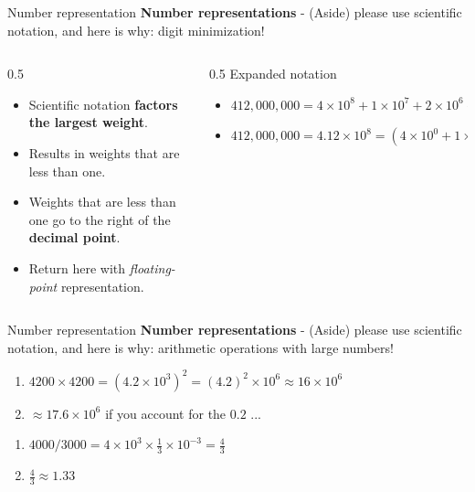 \documentclass{beamer}
\begin{document}
\begin{frame}{Number representation}
\textbf{Number representations} - (Aside) please use scientific notation, and here is why: \alert{digit minimization!} \\ \vspace{1cm}
\begin{columns}[T]
\begin{column}{0.5\textwidth}
\centering
\begin{itemize}
\small
\item Scientific notation \textbf{factors the largest weight}.
\item Results in weights that are less than one.
\item Weights that are less than one go to the right of the \textbf{decimal point}.
\item Return here with \textit{floating-point} representation.
\end{itemize}
\end{column}
\begin{column}{0.5\textwidth}
\centering
Expanded notation \\
\hrulefill
\begin{itemize}
\item $412,000,000 = 4\times 10^8 + 1\times 10^7 + 2\times 10^6 + 0\times 10^5 + 0\times 10^4 + 0\times 10^3 + 0\times 10^2 + 0\times 10^1 + 0\times 10^0$
\item $412,000,000 = 4.12 \times 10^8 = (4\times 10^0 + 1\times 10^{-1} + 2\times 10^{-2}) \times 10^8$
\end{itemize}
\end{column}
\end{columns}
\end{frame}

\begin{frame}{Number representation}
\textbf{Number representations} - (Aside) please use scientific notation, and here is why: \alert{arithmetic operations with large numbers!} \\ \vspace{1cm}
\begin{enumerate}
\item $4200 \times 4200 = (4.2 \times 10^{3})^2 = (4.2)^2 \times 10^6 \approx 16 \times 10^6$
\item $\approx 17.6 \times 10^6$ if you account for the $0.2$ ...
\end{enumerate}
\hrulefill
\begin{enumerate}
\item $4000/3000 = 4 \times 10^{3} \times \frac{1}{3} \times 10^{-3} = \frac{4}{3}$
\item $\frac{4}{3} \approx 1.33$
\end{enumerate}
\end{frame}
\end{document}
